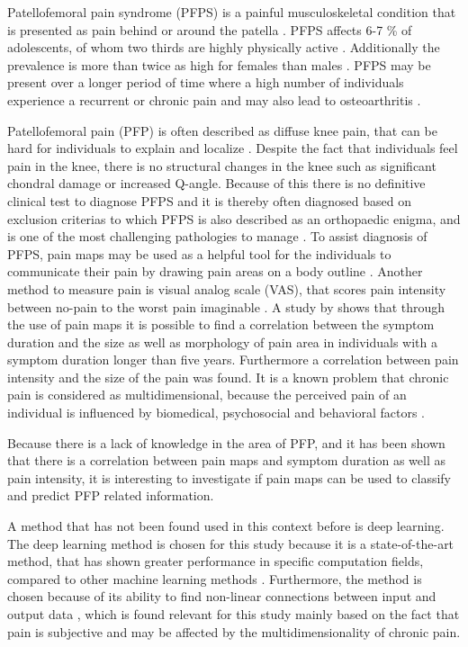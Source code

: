 Patellofemoral pain syndrome (PFPS) is a painful musculoskeletal condition that is presented as pain behind or around the patella \citep{Maclachlan2017, Smith2015}. PFPS affects 6-7 \% of adolescents, of whom two thirds are highly physically active \citep{Rathleff2015}. Additionally the prevalence is more than twice as high for females than males \citep{Rathleff2015, Petersen2013}.
PFPS may be present over a longer period of time where a high number of individuals experience a recurrent or chronic pain \citep{Witvrouw2014} and may also lead to osteoarthritis \citep{Petersen2013, Crossley2016}.

\noindent
Patellofemoral pain (PFP) is often described as diffuse knee pain, that can be hard for individuals to explain and localize \citep{Witvrouw2014}. Despite the fact that individuals feel pain in the knee, there is no structural changes in the knee such as significant chondral damage or increased Q-angle. Because of this there is no definitive clinical test to diagnose PFPS and it is thereby often diagnosed based on exclusion criterias \citep{Petersen2013} to which PFPS is also described as an orthopaedic enigma, and is one of the most challenging pathologies to manage \citep{Dye2001}. 
To assist diagnosis of PFPS, pain maps may be used as a helpful tool for the individuals to communicate their pain by drawing pain areas on a body outline \citep{Boudreau2016}. \newline
Another method to measure pain is visual analog scale (VAS), that scores pain intensity between no-pain to the worst pain imaginable \citep{Haefeli2005}.
A study by \citeauthor{Boudreau2017} shows that through the use of pain maps it is possible to find a correlation between the symptom duration and the size as well as morphology of pain area in individuals with a symptom duration longer than five years. Furthermore a correlation between pain intensity and the size of the pain was found.\citep{Boudreau2017}
It is a known problem that chronic pain is considered as multidimensional, because the perceived pain of an individual is influenced by biomedical, psychosocial and behavioral factors \citep{Dansie2013}.

\noindent
Because there is a lack of knowledge in the area of PFP, and it has been shown that there is a correlation between pain maps and symptom duration as well as pain intensity, it is interesting to investigate if pain maps can be used to classify and predict PFP related information. 

\noindent
A method that has not been found used in this context before is deep learning. The deep learning method is chosen for this study because it is a state-of-the-art method, that has shown greater performance in specific computation fields, compared to other machine learning methods \citep{LeCun2015}.
Furthermore, the method is chosen because of its ability to find non-linear connections between input and output data \citep{LeCun2015}, which is found relevant for this study mainly based on the fact that pain is subjective and may be affected by the multidimensionality of chronic pain.  \\


